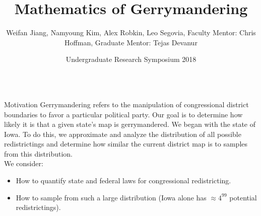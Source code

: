 \documentclass[leqno, handout]{beamer}
\title{
\veryHuge
Mathematics of Gerrymandering}
\author{
  \LARGE
Weifan Jiang, Namyoung Kim, Alex Robkin, Leo Segovia, Faculty Mentor: Chris Hoffman, Graduate Mentor: Tejas Devanur}
\institute{

{\Large{ Washington Experimental Mathematics Lab}}
}
\date{\large Undergraduate Research Symposium 2018 }
\theoremstyle{definition}
\begin{document}
\begin{frame}


\begin{block}{}
\titlepage
\end{block}


\begin{columns}[t]


\begin{column}[t]{.25\linewidth}

\begin{block}{Motivation}
Gerrymandering refers to the manipulation of congressional district boundaries to favor a particular political party. Our goal is to determine how likely it is that a given state's map is gerrymandered. We began with the state of Iowa. To do this, we approximate and analyze the distribution of all possible redistrictings and determine how similar the current district map is to samples from this distribution.
\\
We consider:
\begin{itemize}
\item How to quantify state and federal laws for congressional redistricting.
\item How to sample from such a large distribution (Iowa alone has $\approx 4^{99}$ potential redistrictings).
\end{itemize}
 


\end{block}
\end{column}
\end{columns}
\end{frame}
\end{document}
